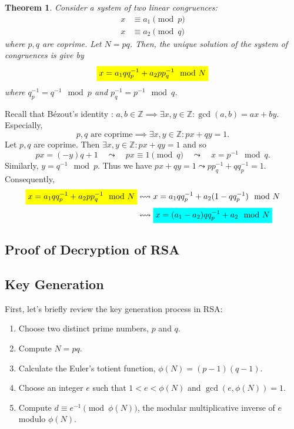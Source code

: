 \documentclass{article}
\newcommand{\mathcolorbox}[2]{\colorbox{#1}{$\displaystyle #2$}}
\newcommand{\inv}[1]{#1^{-1}}
\newtheorem*{theorem*}{Theorem}
\theoremstyle{definition}
\begin{document}
\begin{tcolorbox}[title=Chinese Remainder Theorem (CRT) - Special Case]
	\begin{theorem*}
		Consider a system of two linear congruences:
		\begin{align*}
			x&\equiv a_1 \pmod{p}\\
			x&\equiv a_2 \pmod{q}
		\end{align*} where $p,q$ are coprime. Let $N=pq$. Then, the unique solution of the system of congruences is give by \begin{align*}
			\mathcolorbox{-blue}{x=a_1qq_p^{-1}+a_2pp_q^{-1}\mod{N}}
		\end{align*} where $q_p^{-1}=\inv{q}\mod{p}$ and $p_{q}^{-1}=\inv{p}\mod{q}$.
	\end{theorem*}
	\tcblower
	Recall that Bézout's identity : $
	a,b\in\mathbb{Z}\implies\exists x,y\in\mathbb{Z}:\gcd(a,b)=ax+by.
	$ Especially, \[
	\text{$p,q$ are coprime}\implies\exists x,y\in\mathbb{Z}: px+qy=1.
	\] Let $p,q$ are coprime. Then $\exists x,y\in\mathbb{Z}:px+qy=1$ and so \[
	px=(-y)q+1\quad\leadsto\quad px\equiv1\pmod{q}\quad\leadsto\quad x=p^{-1}\mod{q}.
	\] Similarly, $y=q^{-1}\mod{p}$. Thus we have $px+qy=1\leadsto pp_{q}^{-1}+qq_{p}^{-1}=1$. Consequently, \begin{align*}
		\mathcolorbox{-blue}{x=a_1qq_p^{-1}+a_2pp_q^{-1}\mod{N}} &\leftrightsquigarrow x=a_1qq_p^{-1}+a_2(1-qq_{p}^{-1})\mod{N}\\
		&\leftrightsquigarrow \mathcolorbox{-red}{x=(a_1-a_2)qq_p^{-1}+a_2\mod{N}}\\
	\end{align*}
\end{tcolorbox}

\subsection{Proof of Decryption of RSA}

\subsection*{Key Generation}
First, let's briefly review the key generation process in RSA:

\begin{enumerate}
	\item Choose two distinct prime numbers, $p$ and $q$.
	\item Compute $N = pq$.
	\item Calculate the Euler's totient function, $\phi(N) = (p - 1)(q - 1)$.
	\item Choose an integer $e$ such that $1 < e < \phi(N)$ and $\gcd(e, \phi(N)) = 1$.
	\item Compute $d \equiv e^{-1} \pmod{\phi(N)}$, the modular multiplicative inverse of $e$ modulo $\phi(N)$.
\end{enumerate}
\end{document}
